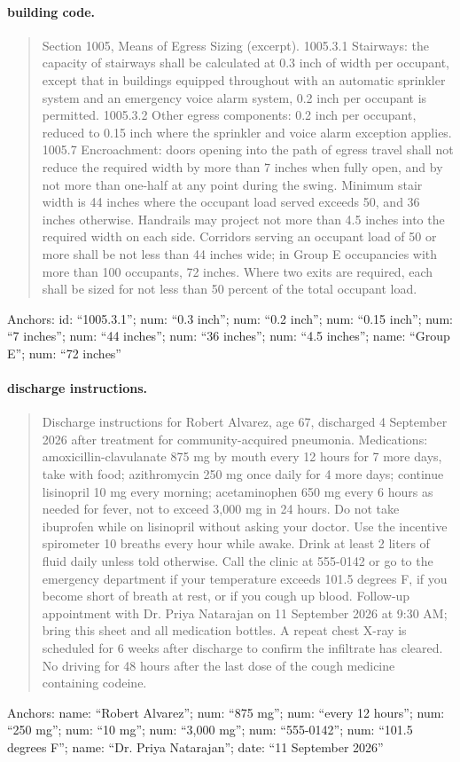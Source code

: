 \paragraph{building code.}
\begin{quote}\small Section 1005, Means of Egress Sizing (excerpt). 1005.3.1 Stairways: the capacity of stairways shall be calculated at 0.3 inch of width per occupant, except that in buildings equipped throughout with an automatic sprinkler system and an emergency voice alarm system, 0.2 inch per occupant is permitted. 1005.3.2 Other egress components: 0.2 inch per occupant, reduced to 0.15 inch where the sprinkler and voice alarm exception applies. 1005.7 Encroachment: doors opening into the path of egress travel shall not reduce the required width by more than 7 inches when fully open, and by not more than one-half at any point during the swing. Minimum stair width is 44 inches where the occupant load served exceeds 50, and 36 inches otherwise. Handrails may project not more than 4.5 inches into the required width on each side. Corridors serving an occupant load of 50 or more shall be not less than 44 inches wide; in Group E occupancies with more than 100 occupants, 72 inches. Where two exits are required, each shall be sized for not less than 50 percent of the total occupant load.\end{quote}
\noindent\footnotesize Anchors: id: ``1005.3.1''; num: ``0.3 inch''; num: ``0.2 inch''; num: ``0.15 inch''; num: ``7 inches''; num: ``44 inches''; num: ``36 inches''; num: ``4.5 inches''; name: ``Group E''; num: ``72 inches''\normalsize

\paragraph{discharge instructions.}
\begin{quote}\small Discharge instructions for Robert Alvarez, age 67, discharged 4 September 2026 after treatment for community-acquired pneumonia. Medications: amoxicillin-clavulanate 875 mg by mouth every 12 hours for 7 more days, take with food; azithromycin 250 mg once daily for 4 more days; continue lisinopril 10 mg every morning; acetaminophen 650 mg every 6 hours as needed for fever, not to exceed 3,000 mg in 24 hours. Do not take ibuprofen while on lisinopril without asking your doctor. Use the incentive spirometer 10 breaths every hour while awake. Drink at least 2 liters of fluid daily unless told otherwise. Call the clinic at 555-0142 or go to the emergency department if your temperature exceeds 101.5 degrees F, if you become short of breath at rest, or if you cough up blood. Follow-up appointment with Dr. Priya Natarajan on 11 September 2026 at 9:30 AM; bring this sheet and all medication bottles. A repeat chest X-ray is scheduled for 6 weeks after discharge to confirm the infiltrate has cleared. No driving for 48 hours after the last dose of the cough medicine containing codeine.\end{quote}
\noindent\footnotesize Anchors: name: ``Robert Alvarez''; num: ``875 mg''; num: ``every 12 hours''; num: ``250 mg''; num: ``10 mg''; num: ``3,000 mg''; num: ``555-0142''; num: ``101.5 degrees F''; name: ``Dr. Priya Natarajan''; date: ``11 September 2026''\normalsize

